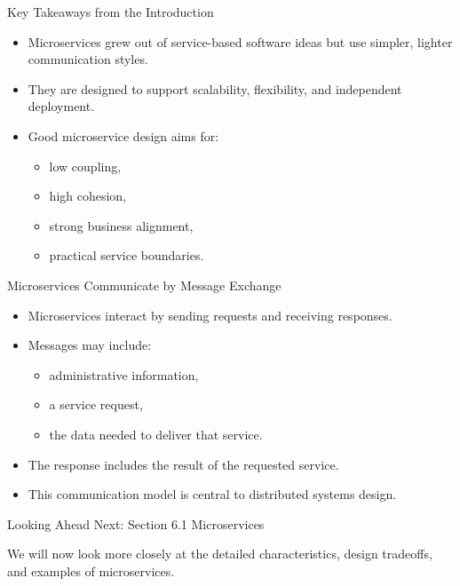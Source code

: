 \begin{frame}{Key Takeaways from the Introduction}
\begin{itemize}
    \item Microservices grew out of service-based software ideas but use simpler, lighter communication styles.
    \item They are designed to support scalability, flexibility, and independent deployment.
    \item Good microservice design aims for:
    \begin{itemize}
        \item low coupling,
        \item high cohesion,
        \item strong business alignment,
        \item practical service boundaries.
    \end{itemize}
\end{itemize}
\end{frame}

\begin{frame}{Microservices Communicate by Message Exchange}
\begin{itemize}
    \item Microservices interact by sending requests and receiving responses.
    \item Messages may include:
    \begin{itemize}
        \item administrative information,
        \item a service request,
        \item the data needed to deliver that service.
    \end{itemize}
    \item The response includes the result of the requested service.
    \item This communication model is central to distributed systems design.
\end{itemize}
\end{frame}


\begin{frame}{Looking Ahead}
\centering
\Large Next: Section 6.1 Microservices

\vspace{1em}

\normalsize
We will now look more closely at the detailed characteristics, design tradeoffs, and examples of microservices.
\end{frame}
